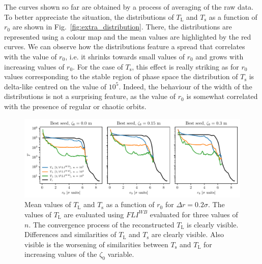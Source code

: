 The curves shown so far are obtained by a process of averaging of the raw data. To better appreciate the situation, the distributions of $T_\mathrm{L}$ and $T_\mathrm{s}$ as a function of $r_0$ are shown in Fig.~\ref{fig:extra_distribution}. There, the distributions are represented using a colour map and the mean values are highlighted by the red curves. We can observe how the distributions feature a spread that correlates with the value of $r_0$, i.e. it shrinks towards small values of $r_0$ and grows with increasing values of $r_0$. For the case of $T_\mathrm{s}$, this effect is really striking as for $r_0$ values corresponding to the stable region of phase space the distribution of $T_\mathrm{s}$ is delta-like centred on the value of $10^5$. Indeed, the behaviour of the width of the distributions is not a surprising feature, as the value of $r_0$ is somewhat correlated with the presence of regular or chaotic orbits. 

\begin{figure}
    \centering
    \includegraphics[width=1\textwidth]{6_lhc_dynamic_indicators/figs/lyapunov_time_vs_radius.pdf}
    \caption{Mean values of $T_\mathrm{L}$ and $T_\mathrm{s}$ as a function of $r_0$ for $\Delta r = 0.2\sigma$. The values of $T_\mathrm{L}$ are evaluated using $FLI^{{WB}}$ evaluated for three values of $n$. The convergence process of the reconstructed $T_\mathrm{L}$ is clearly visible. Differences and similarities of $T_\mathrm{L}$ and $T_\mathrm{s}$ are clearly visible. Also visible is the worsening of similarities between $T_\mathrm{s}$ and $T_\mathrm{L}$ for increasing values of the $\zeta_0$ variable. }
    \label{fig:ts_vs_tl}
\end{figure}

